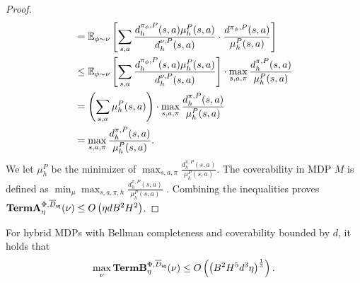 \begin{proof}
\begin{align}
        &= \mathbb{E}_{\phi\sim \nu}  \left[\sum_{s,a} \frac{d_h^{\pi_\phi, P}(s,a) \mu_h^P(s,a)}{d_h^{\nu, P}(s,a)}\cdot \frac{d^{\pi_\phi, P}(s,a)}{\mu_h^P(s,a)}\right] \nonumber \\
        &\leq \mathbb{E}_{\phi\sim \nu}  \left[\sum_{s,a} \frac{d_h^{\pi_\phi, P}(s,a) \mu_h^P(s,a)}{d_h^{\nu, P}(s,a)} \right] \cdot\max_{s,a, \pi}\frac{d_h^{\pi, P}(s,a)}{\mu_h^P(s,a)} \nonumber \\
        &= \left(\sum_{s,a} \mu_h^P(s,a)\right) \cdot \max_{s,a, \pi}\frac{d_h^{\pi, P}(s,a)}{\mu_h^P(s,a)} \nonumber \\
        &= \max_{s,a, \pi}\frac{d_h^{\pi, P}(s,a)}{\mu_h^P(s,a)}. \label{eq:cov_bound} 
    \end{align}
    We let $\mu_h^P$ be the minimizer of $\max_{s,a, \pi}\frac{d_h^{\pi, P}(s,a)}{\mu_h^P(s,a)}$. The coverability in MDP $M$ is defined as $\min_\mu \max_{s,a, \pi, h}\frac{d_h^{\pi, P}(s,a)}{\mu_h^P(s,a)}$ \citep{xie2022role}. Combining the inequalities proves $\textbf{\textup{TermA}}_\eta^{\Phi, \overline{D}_{\mathsf{sq}}}(\nu) \leq O\left(\eta d B^2 H^2\right)$. 
\end{proof}



\begin{lemma}\label{lem: bound Qcomp cov}

For hybrid MDPs with Bellman completeness and coverability bounded by $d$, it holds that 
\begin{align*}
    \max_\nu \textbf{\textup{TermB}}^{\Phi, \overline{D}_{\mathsf{sq}}}_\eta(\nu) \le O\left(\left(B^2 H^5 d^3 \eta\right)^{\frac{1}{3}}\right).  
\end{align*}
\end{lemma}

